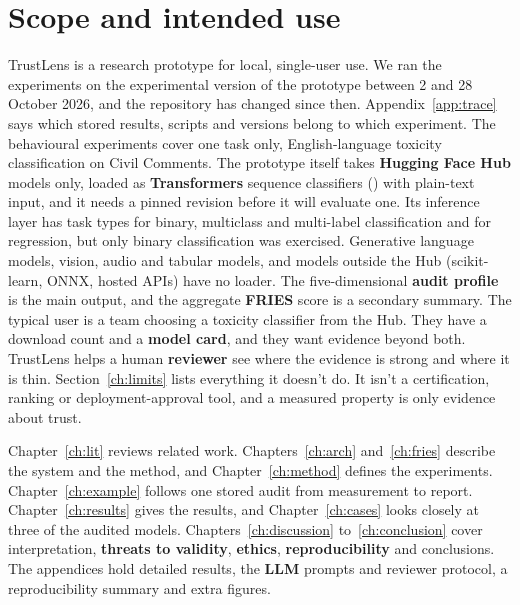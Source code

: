 \section{Scope and intended use}\label{sec:scope}
TrustLens is a research prototype for local, single-user use. We ran the experiments on the experimental version of the prototype between 2 and 28 October 2026, and the repository has changed since then. Appendix~\ref{app:trace} says which stored results, scripts and versions belong to which experiment. The behavioural experiments cover one task only, English-language toxicity classification on Civil Comments. The prototype itself takes \textbf{Hugging Face Hub} models only, loaded as \textbf{Transformers} sequence classifiers () with plain-text input, and it needs a pinned revision before it will evaluate one. Its inference layer has task types for binary, multiclass and multi-label classification and for regression, but only binary classification was exercised. Generative language models, vision, audio and tabular models, and models outside the Hub (scikit-learn, ONNX, hosted APIs) have no loader. The five-dimensional \textbf{audit profile} is the main output, and the aggregate \textbf{FRIES} score is a secondary summary. The typical user is a team choosing a toxicity classifier from the Hub. They have a download count and a \textbf{model card}, and they want evidence beyond both. TrustLens helps a human \textbf{reviewer} see where the evidence is strong and where it is thin. Section~\ref{ch:limits} lists everything it doesn't do. It isn't a certification, ranking or deployment-approval tool, and a measured property is only evidence about trust.

Chapter~\ref{ch:lit} reviews related work. Chapters~\ref{ch:arch} and~\ref{ch:fries} describe the system and the method, and Chapter~\ref{ch:method} defines the experiments. Chapter~\ref{ch:example} follows one stored audit from measurement to report. Chapter~\ref{ch:results} gives the results, and Chapter~\ref{ch:cases} looks closely at three of the audited models. Chapters~\ref{ch:discussion} to~\ref{ch:conclusion} cover interpretation, \textbf{threats to validity}, \textbf{ethics}, \textbf{reproducibility} and conclusions. The appendices hold detailed results, the \textbf{LLM} prompts and reviewer protocol, a reproducibility summary and extra figures.

